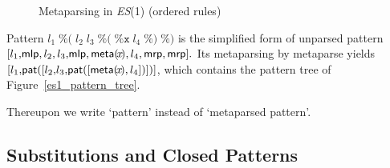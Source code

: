 \begin{figure}[t]
\caption{Meta\-parsing in \textit{ES}(1) (ordered rules)
\label{es1_metaparsing}}
\end{figure}

\smallskip

\noindent Pattern \(l_1 \; \texttt{\%(} \; l_2 \; l_3 \; \texttt{\%(}
\; \texttt{\%x} \; l_4 \; \texttt{\%)} \; \texttt{\%)}\) is the
simplified form of unparsed pattern \([l_1, \!\textsf{mlp}, l_2, l_3, \!\textsf{mlp},
\textsf{meta}(\!x\!), l_4, \textsf{mrp}, \textsf{mrp}].\) Its meta\-parsing by
\textsf{meta\-parse} yields \([l_1, \!\textsf{pat}([l_2, \!l_3,
\!\textsf{pat}([\textsf{meta}(\!x\!), l_4])])]\), which contains the pattern tree of
Figure~\ref{es1_pattern_tree}.
\begin{remark}
Thereupon we write `pattern' instead of `meta\-parsed pattern'.
\end{remark}


\subsection{Substitutions and Closed Patterns}

